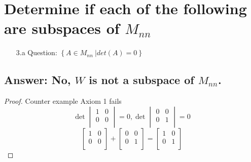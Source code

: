 \documentclass[12pt]{article}
\newcommand{\DS} [1] {${\displaystyle #1}$}
\begin{document}
\section{Determine if each of the following are subspaces of $M_{nn}$}
\begin{enumerate}
        \item [3.a]Question: \DS{ \left\{A\in{M_{nn}} \ | det (A) = 0 \right\}}
\end{enumerate}
\subsection{Answer: No, $W$ is not a subspace of $M_{nn}$.}
\begin{proof}
        Counter example Axiom 1 fails \\
        \begin{equation*}
                \det
                \begin{vmatrix}
                        {1} & {0} \\
                        {0} & {0} \\
                \end{vmatrix}
                {= 0},
                \det
                \begin{vmatrix}
                        {0} & {0} \\
                        {0} & {1} \\
                \end{vmatrix}
                = 0
        \end{equation*}
        \begin{equation*}
                \begin{bmatrix}
                        {1} & {0} \\
                        {0} & {0} \\
                \end{bmatrix}
                +
                \begin{bmatrix}
                        {0} & {0} \\
                        {0} & {1} \\
                \end{bmatrix}
                =
                \begin{bmatrix}
                        {1} & {0} \\
                        {0} & {1} \\
                \end{bmatrix}

\end{equation*}
\end{proof}
\end{document}
